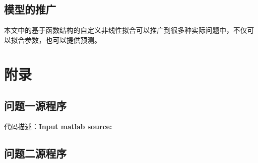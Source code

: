 \documentclass[12pt]{cumcmart}   %
\begin{document}
\subsection{模型的推广}
本文中的基于函数结构的自定义非线性拟合可以推广到很多种实际问题中，不仅可以拟合参数，也可以提供预测\cite{abc}。\cite{t-SNE} \cite{scikit-learn,CC01a} \cite{kingma2013auto}






\makebox{}












	
    
    
    
    
   

\newpage

\appendix
\section{附录}
\subsection{问题一源程序}



代码描述：\textbf{\textcolor[rgb]{0.98,0.00,0.00}{Input matlab source:}}


\subsection{问题二源程序}
\end{document}
